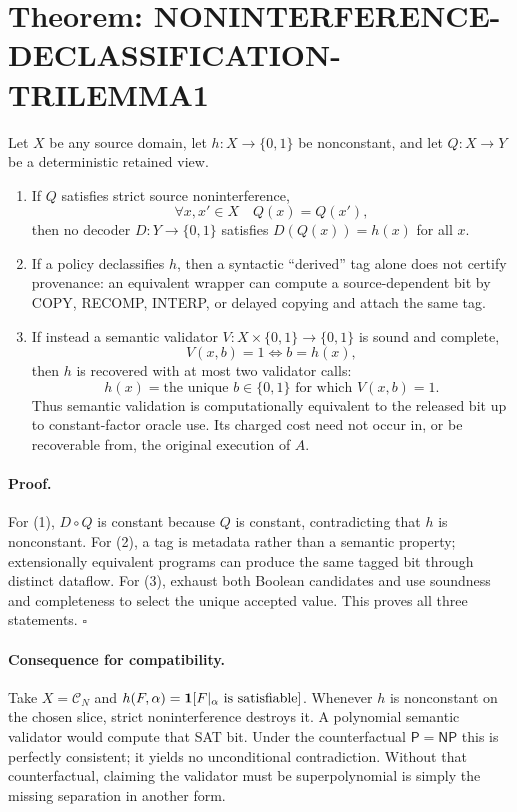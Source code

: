 \documentclass[11pt]{article}
\begin{document}
\section*{Theorem: NONINTERFERENCE-DECLASSIFICATION-TRILEMMA1}
Let $X$ be any source domain, let $h:X\to\{0,1\}$ be nonconstant, and let
$Q:X\to Y$ be a deterministic retained view.

\begin{enumerate}
\item If $Q$ satisfies strict source noninterference,
\[
  \forall x,x'\in X\quad Q(x)=Q(x'),
\]
then no decoder $D:Y\to\{0,1\}$ satisfies $D(Q(x))=h(x)$ for all $x$.
\item If a policy declassifies $h$, then a syntactic ``derived'' tag alone does
not certify provenance: an equivalent wrapper can compute a source-dependent
bit by COPY, RECOMP, INTERP, or delayed copying and attach the same tag.
\item If instead a semantic validator $V:X\times\{0,1\}\to\{0,1\}$ is sound
and complete,
\[
 V(x,b)=1 \Longleftrightarrow b=h(x),
\]
then $h$ is recovered with at most two validator calls:
\[
 h(x)=\text{the unique }b\in\{0,1\}\text{ for which }V(x,b)=1.
\]
Thus semantic validation is computationally equivalent to the released bit up
to constant-factor oracle use.  Its charged cost need not occur in, or be
recoverable from, the original execution of $A$.
\end{enumerate}

\paragraph{Proof.}
For (1), $D\circ Q$ is constant because $Q$ is constant, contradicting that
$h$ is nonconstant.  For (2), a tag is metadata rather than a semantic
property; extensionally equivalent programs can produce the same tagged bit
through distinct dataflow.  For (3), exhaust both Boolean candidates and use
soundness and completeness to select the unique accepted value.  This proves
all three statements. \hfill$\square$

\paragraph{Consequence for compatibility.}
Take $X=\mathcal C_N$ and $h(F,\alpha)={\bf 1}[F|_\alpha\text{ is
satisfiable}]$.  Whenever $h$ is nonconstant on the chosen slice, strict
noninterference destroys it.  A polynomial semantic validator would compute
that SAT bit.  Under the counterfactual $\mathsf P=\mathsf{NP}$ this is
perfectly consistent; it yields no unconditional contradiction.  Without
that counterfactual, claiming the validator must be superpolynomial is simply
the missing separation in another form.
\end{document}
